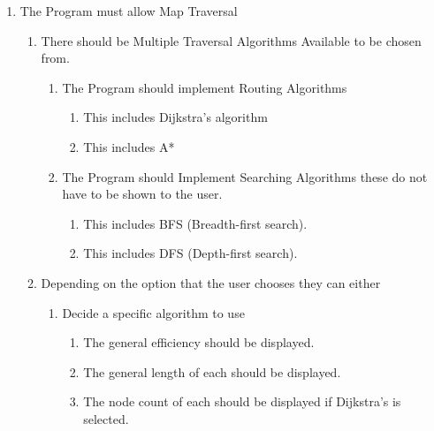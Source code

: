 \begin{FlushLeft}
\begin{enumerate}
            \item The Program must allow Map Traversal
            \begin{enumerate}
                \item There should be Multiple Traversal Algorithms Available to be chosen from.
                    \begin{enumerate}
                        \item The Program should implement Routing Algorithms 
                        \begin{enumerate}
                            \item This includes Dijkstra's algorithm
                            \item This includes A*
                        \end{enumerate}
                        \item The Program should Implement Searching Algorithms these do not have to be shown to the user.
                        \begin{enumerate}
                            \item This includes BFS (Breadth-first search).
                            \item This includes DFS (Depth-first search).
                        \end{enumerate}
                    \end{enumerate}
                \item Depending on the option that the user chooses they can either
                \begin{enumerate}
                    \item Decide a specific algorithm to use
                    \begin{enumerate}
                        \item The general efficiency should be displayed.
                        \item The general length of each should be displayed.
                        \item The node count of each should be displayed if Dijkstra's is selected.
                    \end{enumerate}
                \end{enumerate}
            \end{enumerate}
            

\end{enumerate}
\end{FlushLeft}
